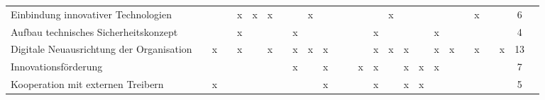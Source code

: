 \begin{sidewaystable}[ht]
\begin{tabular}{|p{6cm}|c|c|c|c|c|c|c|c|c|c|c|c|c|c|c|c|c|c|c|c|c|c|c|c|c|}
		Einbindung innovativer Technologien                 &                   &                    &                    & x                    & x                  & x                 &                   &                      & x                  &                      &                  &                  &                     &                  & x               &                      &                    &                 &                  &                  & x                      &                      &                        & 6  \\
		Aufbau technisches Sicherheitskonzept      &                   &                    &                    & x                    &                    &                   &                   & x                    &                    &                      &                  &                  &                     & x                &                 &                      &                    & x               &                  &                  &                        &                      &                        & 4  \\
		Digitale Neuausrichtung der Organisation            &                   & x                  &                    & x                    &                    & x                 &                   & x                    & x                  & x                    &                  &                  &                     & x                & x               & x                    &                    & x               & x                &                  & x                      &                      & x                      & 13 \\
		Innovationsförderung                                &                   &                    &                    &                      &                    &                   &                   & x                    &                    & x                    &                  &                  & x                   & x                &                 & x                    & x                  & x               &                  &                  &                        &                      &                        & 7  \\
		Kooperation mit externen Treibern                   &                   & x                  &                    &                      &                    &                   &                   &                      &                    & x                    &                  &                  &                     & x                &                 & x                    & x                  &                 &                  &                  &                        &                      &                        & 5 \\
		\hline
	\end{tabular}
	\label{tab:clusteringchangeprocess}
\end{sidewaystable}

